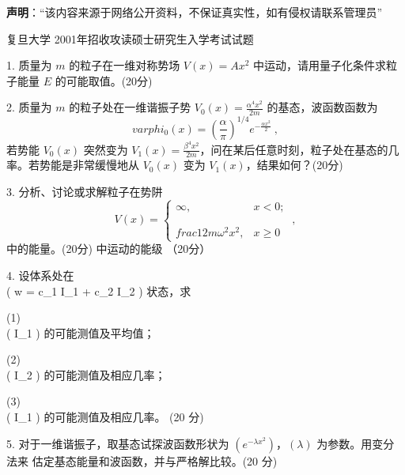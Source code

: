 



\textbf{声明}：“该内容来源于网络公开资料，不保证真实性，如有侵权请联系管理员”

复旦大学 2001年招收攻读硕士研究生入学考试试题

1. 质量为 $m$ 的粒子在一维对称势场 $V(x) = Ax^2$ 中运动，请用量子化条件求粒子能量 $E$ 的可能取值。(20分)

2. 质量为 $m$ 的粒子处在一维谐振子势 $V_0(x) = \frac{\alpha^4 x^2}{2m}$ 的基态，波函数函数为
$$ varphi_0(x) = \left(\frac{\alpha}{\pi}\right)^{1/4} e^{-\frac{\alpha x^2}{2}}~,$$ 
若势能 $V_0(x)$ 突然变为 $V_1(x) = \frac{\beta^4 x^2}{2m}$，问在某后任意时刻，粒子处在基态的几率。若势能是非常缓慢地从 $V_0(x)$ 变为 $V_1(x)$，结果如何？(20分)

3. 分析、讨论或求解粒子在势阱
$$  V(x) = \begin{cases} \infty, & x < 0; \\\\ \\frac{1}{2} m \omega^2 x^2, & x \geq 0 \end{cases}~,$$ 
中的能量。(20分)
中运动的能级 （20分）

4. 设体系处在 \\( w = c_1 I_1 + c_2 I_2 ) 状态，求

(1) \\( I_1 ) 的可能测值及平均值；

(2) \\( I_2 ) 的可能测值及相应几率；

(3) \\( I_1 ) 的可能测值及相应几率。 (20 分)

5. 对于一维谐振子，取基态试探波函数形状为 $( e^{-\lambda x^2} )$，$(\lambda)$ 为参数。用变分法来
    估定基态能量和波函数，并与严格解比较。(20 分)
